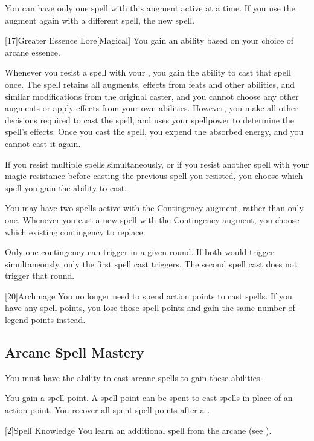         You can have only one spell with this augment active at a time.
        If you use the augment again with a different spell, the new spell.

        [17]{Greater Essence Lore}[Magical]
        You gain an ability based on your choice of arcane essence.

         Whenever you resist a spell with your , you gain the ability to cast that spell once.
        The spell retains all augments, effects from feats and other abilities, and similar modifications from the original caster, and you cannot choose any other augments or apply effects from your own abilities.
        However, you make all other decisions required to cast the spell, and uses your spellpower to determine the spell's effects.
        Once you cast the spell, you expend the absorbed energy, and you cannot cast it again.

        If you resist multiple spells simultaneously, or if you resist another spell with your magic resistance before casting the previous spell you resisted, you choose which spell you gain the ability to cast.

         You may have two spells active with the Contingency augment, rather than only one.
        Whenever you cast a new spell with the Contingency augment, you choose which existing contingency to replace.

        Only one contingency can trigger in a given round.
        If both would trigger simultaneously, only the first spell cast triggers.
        The second spell cast does not trigger that round.

        [20]{Archmage}
        You no longer need to spend action points to cast spells.
        If you have any spell points, you lose those spell points and gain the same number of legend points instead.

    \subsection{Arcane Spell Mastery}
        You must have the ability to cast arcane spells to gain these abilities.

        You gain a spell point.
        A spell point can be spent to cast spells in place of an action point.
        You recover all spent spell points after a .

        [2]{Spell Knowledge} 
        You learn an additional spell from the arcane  (see ).

